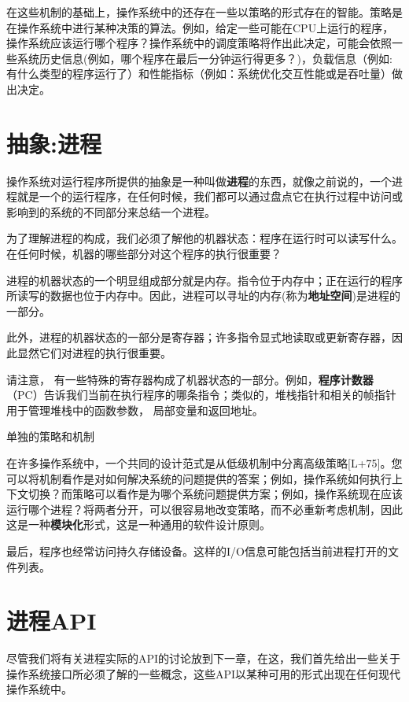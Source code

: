 在这些机制的基础上，操作系统中的还存在一些以策略的形式存在的智能。策略是在操作系统中进行某种决策的算法。例如，给定一些可能在CPU上运行的程序，操作系统应该运行哪个程序？操作系统中的调度策略将作出此决定，可能会依照一些系统历史信息(例如，哪个程序在最后一分钟运行得更多？)，负载信息（例如:有什么类型的程序运行了）和性能指标（例如：系统优化交互性能或是吞吐量）做出决定。
\section{抽象:进程}
操作系统对运行程序所提供的抽象是一种叫做\textbf{进程}的东西，就像之前说的，一个进程就是一个的运行程序，在任何时候，我们都可以通过盘点它在执行过程中访问或影响到的系统的不同部分来总结一个进程。

为了理解进程的构成，我们必须了解他的机器状态：程序在运行时可以读写什么。在任何时候，机器的哪些部分对这个程序的执行很重要？

进程的机器状态的一个明显组成部分就是内存。指令位于内存中；正在运行的程序所读写的数据也位于内存中。因此，进程可以寻址的内存(称为\textbf{地址空间})是进程的一部分。

此外，进程的机器状态的一部分是寄存器；许多指令显式地读取或更新寄存器，因此显然它们对进程的执行很重要。

请注意， 有一些特殊的寄存器构成了机器状态的一部分。例如，\textbf{程序计数器}（PC）告诉我们当前在执行程序的哪条指令；类似的，堆栈指针和相关的帧指针用于管理堆栈中的函数参数， 局部变量和返回地址。

\begin{tcolorbox}[colframe=grey,colback= grey,arc=0pt,left=6pt,right=6pt,top=6pt,bottom=6pt,boxsep=0pt]
  \begin{center}
  单独的策略和机制\\
  \end{center}
  在许多操作系统中，一个共同的设计范式是从低级机制中分离高级策略[L+75]。您可以将机制看作是对如何解决系统的问题提供的答案；例如，操作系统如何执行上下文切换？而策略可以看作是为哪个系统问题提供方案；例如，操作系统现在应该运行哪个进程？将两者分开，可以很容易地改变策略，而不必重新考虑机制，因此这是一种\textbf{模块化}形式，这是一种通用的软件设计原则。
  \end{tcolorbox}
最后，程序也经常访问持久存储设备。这样的I/O信息可能包括当前进程打开的文件列表。

\section{进程API}
尽管我们将有关进程实际的API的讨论放到下一章，在这，我们首先给出一些关于操作系统接口所必须了解的一些概念，这些API以某种可用的形式出现在任何现代操作系统中。

